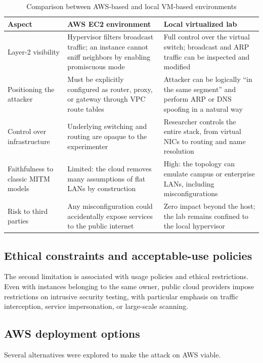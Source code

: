 \documentclass[conference]{IEEEtran}
\begin{document}
\begin{table}[htbp]
\caption{Comparison between AWS-based and local VM-based environments}
\label{tab:env_comparison}
\begin{center}
\begin{tabular}{@{}p{1.5cm} p{3.2cm} p{3.2cm}@{}} \hline
\textbf{Aspect} & \textbf{AWS EC2 environment} & \textbf{Local virtualized lab} \\ \hline
Layer-2 visibility & Hypervisor filters broadcast traffic; an instance cannot sniff neighbors by enabling promiscuous mode & Full control over the virtual switch; broadcast and ARP traffic can be inspected and modified \\
Positioning the attacker & Must be explicitly configured as router, proxy, or gateway through VPC route tables & Attacker can be logically ``in the same segment'' and perform ARP or DNS spoofing in a natural way \\
Control over infrastructure & Underlying switching and routing are opaque to the experimenter & Researcher controls the entire stack, from virtual NICs to routing and name resolution \\
Faithfulness to classic MITM models & Limited: the cloud removes many assumptions of flat LANs by construction & High: the topology can emulate campus or enterprise LANs, including misconfigurations \\
Risk to third parties & Any misconfiguration could accidentally expose services to the public internet & Zero impact beyond the host; the lab remains confined to the local hypervisor \\ \hline
\end{tabular}
\end{center}
\end{table}

\subsection{Ethical constraints and acceptable-use policies}
The second limitation is associated with usage policies and ethical restrictions. Even with instances belonging to the same owner, public cloud providers impose restrictions on intrusive security testing, with particular emphasis on traffic interception, service impersonation, or large-scale scanning. 

\subsection{AWS deployment options}
Several alternatives were explored to make the attack on AWS viable.
\end{document}
